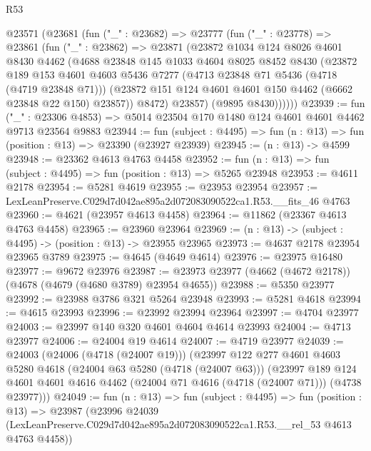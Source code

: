 \begin{lexlean}{R53}
\begin{coremodule}
    @23571
      (@23681
        (fun ("_" : @23682) =>
        @23777
          (fun ("_" : @23778) =>
          @23861
            (fun ("_" : @23862) =>
            @23871
              (@23872
                @1034
                @124
                @8026
                @4601
                @8430
                @4462
                (@4688
                  @23848
                  @145
                  @1033
                  @4604
                  @8025
                  @8452
                  @8430
                  (@23872
                    @189
                    @153
                    @4601
                    @4603
                    @5436
                    @7277
                    (@4713 @23848 @71 @5436 (@4718 (@4719 @23848 @71)))
                    (@23872 @151 @124 @4601 @4601 @150 @4462 (@6662 @23848 @22 @150) @23857))
                  @8472)
                @23857)
              (@9895 @8430))))))
@23939 := fun ("_" : @23306 @4853) =>
  @5014 @23504 @170 @1480 @124 @4601 @4601 @4462 @9713 @23564 @9883
@23944 := fun (subject : @4495) => fun (n : @13) => fun (position : @13) => @23390 (@23927 @23939)
@23945 := (n : @13) -> @4599
@23948 := @23362 @4613 @4763 @4458
@23952 := fun (n : @13) => fun (subject : @4495) => fun (position : @13) => @5265 @23948
@23953 := @4611 @2178
@23954 := @5281 @4619
@23955 := @23953 @23954
@23957 := LexLeanPreserve.C029d7d042ae895a2d072083090522ca1.R53.__fits_46 @4763
@23960 := @4621 (@23957 @4613 @4458)
@23964 := @11862 (@23367 @4613 @4763 @4458)
@23965 := @23960 @23964
@23969 := (n : @13) -> (subject : @4495) -> (position : @13) -> @23955 @23965
@23973 := @4637 @2178 @23954 @23965 @3789
@23975 := @4645 (@4649 @4614)
@23976 := @23975 @16480
@23977 := @9672 @23976
@23987 := @23973 @23977 (@4662 (@4672 @2178)) (@4678 (@4679 (@4680 @3789) @23954 @4655))
@23988 := @5350 @23977
@23992 := @23988 @3786 @321 @5264 @23948
@23993 := @5281 @4618
@23994 := @4615 @23993
@23996 := @23992 @23994 @23964
@23997 := @4704 @23977
@24003 := @23997 @140 @320 @4601 @4604 @4614 @23993
@24004 := @4713 @23977
@24006 := @24004 @19 @4614
@24007 := @4719 @23977
@24039 := @24003
    (@24006 (@4718 (@24007 @19)))
    (@23997
      @122
      @277
      @4601
      @4603
      @5280
      @4618
      (@24004 @63 @5280 (@4718 (@24007 @63)))
      (@23997
        @189
        @124
        @4601
        @4601
        @4616
        @4462
        (@24004 @71 @4616 (@4718 (@24007 @71)))
        (@4738 @23977)))
@24049 := fun (n : @13) =>
  fun (subject : @4495) =>
  fun (position : @13) =>
  @23987
    (@23996
      @24039
      (LexLeanPreserve.C029d7d042ae895a2d072083090522ca1.R53.__rel_53 @4613 @4763 @4458))

\end{coremodule}
\end{lexlean}
